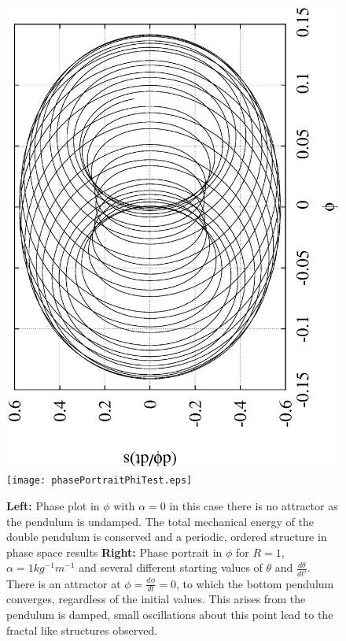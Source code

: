 \documentclass[10pt,a4paper]{article}
\begin{document}
\begin{figure}[h!]
\begin{center}
\includegraphics[scale = 0.3, angle =-90]{phaseUndamped.eps}
\texttt{[image: phasePortraitPhiTest.eps]}
\caption{\textbf{Left: }Phase plot in $\phi$ with $\alpha=0$ in this case there is no attractor as the pendulum is undamped. The total mechanical energy of the double pendulum is conserved and a periodic, ordered structure in phase space results
\textbf{Right:} Phase portrait in $\phi$ for  $R = 1$, $\alpha = 1 kg^{-1}m^{-1}$ and several different starting values of $\theta$ and $\frac{d\theta}{dt'}$. There is an attractor at $\phi = \frac{d\phi}{dt}=0$, to which the bottom pendulum converges, regardless of the initial values. This arises from the pendulum is damped, small oscillations about this point lead to the fractal like structures observed.} 
\label{fig:Attractor}
\end{center}
\end{figure}
\clearpage
\end{document}
